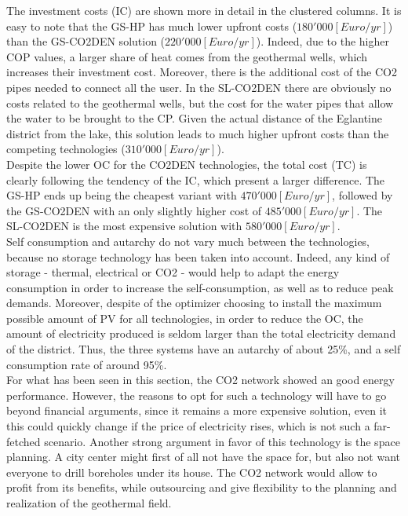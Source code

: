 \documentclass{article}
\begin{document}
The investment costs (IC) are shown more in detail in the clustered columns. It is easy to note that the GS-HP has much lower upfront costs ($180'000[Euro/yr]$) than the GS-CO2DEN solution ($220'000[Euro/yr]$). Indeed, due to the higher COP values, a larger share of heat comes from the geothermal wells, which increases their investment cost. Moreover, there is the additional cost of the CO2 pipes needed to connect all the user. In the SL-CO2DEN there are obviously no costs related to the geothermal wells, but the cost for the water pipes that allow the water to be brought to the CP. Given the actual distance of the Eglantine district from the lake, this solution leads to much higher upfront costs than the competing technologies ($310'000[Euro/yr]$).\\

Despite the lower OC for the CO2DEN technologies, the total cost (TC) is clearly following the tendency of the IC, which present a larger difference. The GS-HP ends up being the cheapest variant with $470'000 [Euro/yr]$, followed by the GS-CO2DEN with an only slightly higher cost of $485'000 [Euro/yr]$. The SL-CO2DEN is the most expensive solution with $580'000 [Euro/yr]$.\\

Self consumption and autarchy do not vary much between the technologies, because no storage technology has been taken into account. Indeed, any kind of storage - thermal, electrical or CO2 - would help to adapt the energy consumption in order to increase the self-consumption, as well as to reduce peak demands. Moreover, despite of the optimizer choosing to install the maximum possible amount of PV for all technologies, in order to reduce the OC, the amount of electricity produced is seldom larger than the total electricity demand of the district. Thus, the three systems have an autarchy of about 25\%, and a self consumption rate of around 95\%.\\

For what has been seen in this section, the CO2 network showed an good energy performance. However, the reasons to opt for such a technology will have to go beyond financial arguments, since it remains a more expensive solution, even it this could quickly change if the price of electricity rises, which is not such a far-fetched scenario. Another strong argument in favor of this technology is the space planning. A city center might first of all not have the space for, but also not want everyone to drill boreholes under its house. The CO2 network would allow to profit from its benefits, while outsourcing and give flexibility to the planning and realization of the geothermal field.
\end{document}
